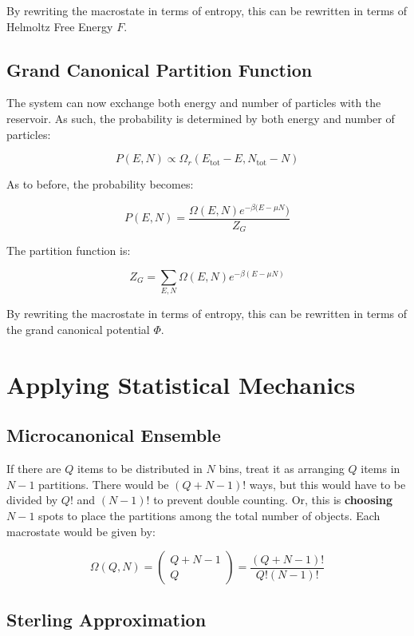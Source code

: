 \documentclass[12pt]{article}
\begin{document}
By rewriting the macrostate in terms of entropy, this can be rewritten in terms of Helmoltz Free Energy $F$.

\subsection{Grand Canonical Partition Function}

The system can now exchange both energy and number of particles with the reservoir. As such, the probability is determined by both energy and number of particles:

\[P(E, N) \propto \Omega_r(E_\text{tot} - E, N_\text{tot} -N)\]

As to before, the probability becomes:

\[\boxed{P(E,N) = \frac{\Omega(E, N) e^{-\beta(E-\mu N})}{Z_G}}\]

The partition function is:

\[\boxed{Z_G = \sum_{E,N}\Omega(E,N)e^{-\beta(E-\mu N)}}\]

By rewriting the macrostate in terms of entropy, this can be rewritten in terms of the grand canonical potential $\Phi$.


\section{Applying Statistical Mechanics}

\subsection{Microcanonical Ensemble}

If there are $Q$ items to be distributed in $N$ bins, treat it as arranging $Q$ items in $N - 1$ partitions. There would be $(Q+N-1)!$ ways, but this would have to be divided by $Q!$ and $(N-1)!$ to prevent double counting. Or, this is \textbf{choosing} $N-1$ spots to place the partitions among the total number of objects. Each macrostate would be given by:

\[ \Omega(Q,N) = 
\left(
\begin{matrix}
Q+N-1\\
Q
\end{matrix}
\right)
=
\frac{(Q+N-1)!}{Q!(N-1)!}
\]

\subsection{Sterling Approximation}
\end{document}
